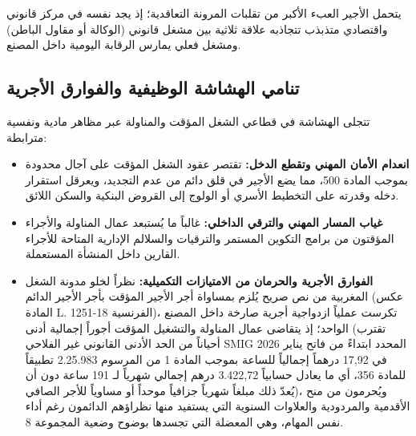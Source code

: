 يتحمل الأجير العبء الأكبر من تقلبات المرونة التعاقدية؛ إذ يجد نفسه في مركز قانوني واقتصادي متذبذب تتجاذبه علاقة ثلاثية بين مشغل قانوني (الوكالة أو مقاول الباطن) ومشغل فعلي يمارس الرقابة اليومية داخل المصنع.

\subsection{تنامي الهشاشة الوظيفية والفوارق الأجرية}
تتجلى الهشاشة في قطاعي الشغل المؤقت والمناولة عبر مظاهر مادية ونفسية مترابطة:
\begin{itemize}[leftmargin=*, itemsep=5pt]
    \item \textbf{انعدام الأمان المهني وتقطع الدخل:} تقتصر عقود الشغل المؤقت على آجال محدودة بموجب المادة \textenglish{500}، مما يضع الأجير في قلق دائم من عدم التجديد، ويعرقل استقرار دخله وقدرته على التخطيط الأسري أو الولوج إلى القروض البنكية والسكن اللائق.
    \item \textbf{غياب المسار المهني والترقي الداخلي:} غالباً ما يُستبعد عمال المناولة والأجراء المؤقتون من برامج التكوين المستمر والترقيات والسلالم الإدارية المتاحة للأجراء القارين داخل المنشأة المستعملة.
    \item \textbf{الفوارق الأجرية والحرمان من الامتيازات التكميلية:} نظراً لخلو مدونة الشغل المغربية من نص صريح يُلزم بمساواة أجر الأجير المؤقت بأجر الأجير الدائم (عكس المادة \textenglish{L. 1251-18} الفرنسية)، تكرست عملياً ازدواجية أجرية صارخة داخل المصنع الواحد؛ إذ يتقاضى عمال المناولة والتشغيل المؤقت أجوراً إجمالية أدنى (تقترب أحياناً من الحد الأدنى القانوني غير الفلاحي \textenglish{SMIG} المحدد ابتداءً من فاتح يناير \textenglish{2026} في \textenglish{17,92} درهماً إجمالياً للساعة بموجب المادة \textenglish{1} من المرسوم \textenglish{2.25.983} تطبيقاً للمادة \textenglish{356}، أي ما يعادل حسابياً \textenglish{3.422,72} درهم إجمالي شهرياً لـ \textenglish{191} ساعة دون أن يُعدّ ذلك مبلغاً شهرياً جزافياً موحداً أو مساوياً للأجر الصافي)، ويُحرمون من منح الأقدمية والمردودية والعلاوات السنوية التي يستفيد منها نظراؤهم الدائمون رغم أداء نفس المهام، وهي المعضلة التي تجسدها بوضوح وضعية المجموعة \textenglish{8}.
\end{itemize}

